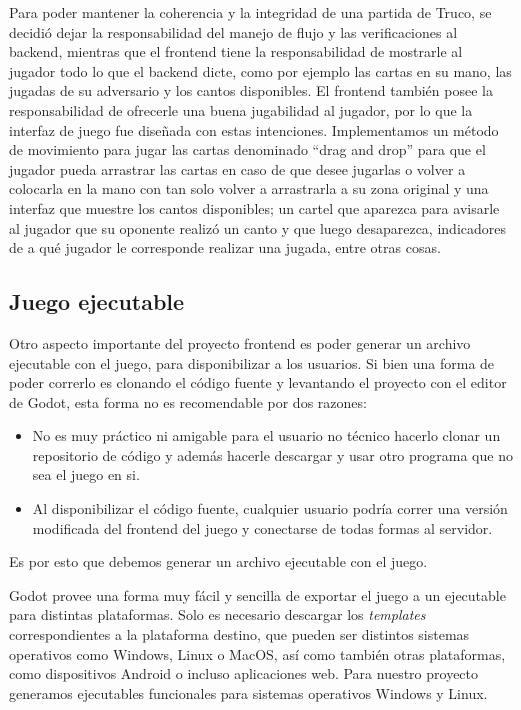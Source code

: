 Para poder mantener la coherencia y la integridad de una partida de Truco, se decidió dejar 
la responsabilidad del manejo de flujo y las verificaciones al backend, mientras que el 
frontend tiene la responsabilidad de mostrarle al jugador todo lo que el backend dicte, 
como por ejemplo las cartas en su mano, las jugadas de su adversario y los cantos disponibles. 
El frontend también posee la responsabilidad de ofrecerle una buena jugabilidad al jugador, 
por lo que la interfaz de juego fue diseñada con estas intenciones. Implementamos un método 
de movimiento para jugar las cartas denominado “drag and drop” para que el jugador pueda 
arrastrar las cartas en caso de que desee jugarlas o volver a colocarla en la mano con tan 
solo volver a arrastrarla a su zona original y una interfaz que muestre los cantos disponibles; 
un cartel que aparezca para avisarle al jugador que su oponente realizó un canto y que luego 
desaparezca, indicadores de a qué jugador le corresponde realizar una jugada, entre otras cosas.

\subsection{Juego ejecutable}
\noindent Otro aspecto importante del proyecto frontend es poder generar un archivo ejecutable con el juego,
para disponibilizar a los usuarios.
Si bien una forma de poder correrlo es clonando el código fuente y levantando el proyecto con el editor
de Godot, esta forma no es recomendable por dos razones:
\begin{itemize}
    \item No es muy práctico ni amigable para el usuario no técnico hacerlo clonar un repositorio de código y además
    hacerle descargar y usar otro programa que no sea el juego en si.
    \item Al disponibilizar el código fuente, cualquier usuario podría correr una versión modificada del 
    frontend del juego y conectarse de todas formas al servidor.
\end{itemize}
Es por esto que debemos generar un archivo ejecutable con el juego.

Godot provee una forma muy fácil y sencilla de exportar el juego a un ejecutable para distintas plataformas.
Solo es necesario descargar los \textit{templates} correspondientes a la plataforma destino, que pueden ser
distintos sistemas operativos como Windows, Linux o MacOS, así como también otras plataformas, como dispositivos
Android o incluso aplicaciones web.
Para nuestro proyecto generamos ejecutables funcionales para sistemas operativos Windows y Linux.